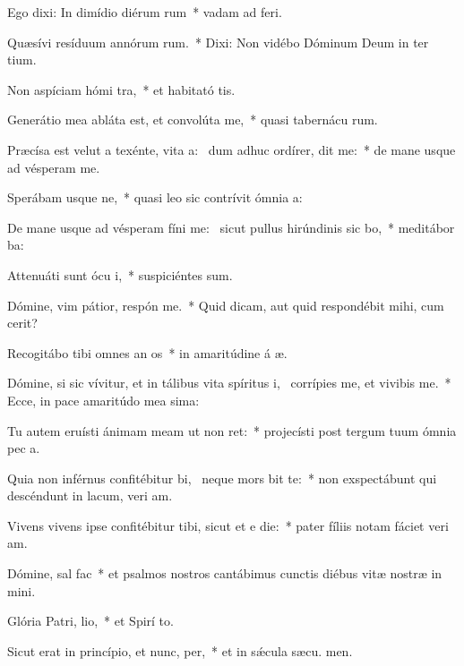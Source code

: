 \item Ego dixi: In dimídio diérum rum~* vadam ad  feri.
\item Quæsívi resíduum annórum rum.~* Dixi: Non vidébo Dóminum Deum in ter tium.
\item Non aspíciam hómi tra,~* et habitató tis.
\item Generátio mea abláta est, et convolúta   me,~* quasi tabernácu rum.
\item Præcísa est velut a texénte, vita a:~\pscross{} dum adhuc ordírer, dit me:~* de mane usque ad vésperam  me.
\item Sperábam usque  ne,~* quasi leo sic contrívit ómnia  a:
\item De mane usque ad vésperam fíni me:~\pscross{} sicut pullus hirúndinis sic bo,~* meditábor  ba:
\item Attenuáti sunt ócu i,~* suspiciéntes  sum.
\item Dómine, vim pátior, respón  me.~* Quid dicam, aut quid respondébit mihi, cum  cerit?
\item Recogitábo tibi omnes an os~* in amaritúdine á æ.
\item Dómine, si sic vívitur, et in tálibus vita spíritus i,~\pscross{} corrípies me, et vivibis me.~* Ecce, in pace amaritúdo mea sima:
\item Tu autem eruísti ánimam meam ut non ret:~* projecísti post tergum tuum ómnia pec a.
\item Quia non inférnus confitébitur bi,~\pscross{} neque mors bit te:~* non exspectábunt qui descéndunt in lacum, veri am.
\item Vivens vivens ipse confitébitur tibi, sicut et e die:~* pater fíliis notam fáciet veri am.
\item Dómine, sal  fac~* et psalmos nostros cantábimus cunctis diébus vitæ nostræ in  mini.
\item Glória Patri,  lio,~* et Spirí to.
\item Sicut erat in princípio, et nunc,  per,~* et in sǽcula sæcu. men.

